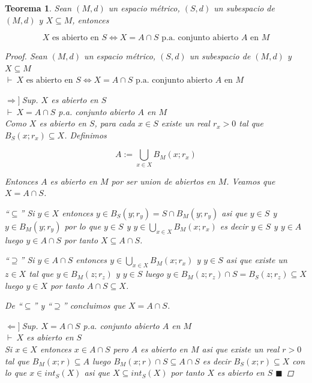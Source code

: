 \documentclass[oneside]{book} %
\theoremstyle{Teorema}
\newtheorem{Teorema}[Definicion]{Teorema}
\theoremstyle{Ejemplos}
\theoremstyle{[Obs]}
\renewcommand{\{}{\left\lbrace} %
\renewcommand{\}}{\right\rbrace} %
\newcommand{\n}{\cap} %
\newcommand{\U}{\bigcup} %
\renewcommand{\sc}{\subseteq} %
\renewcommand{\qed}{$\blacksquare$} %
\newcommand{\pd}{$\vdash\ $} %
\newcommand{\necesidad}{$\Rightarrow]\ $} %
\newcommand{\suficiencia}{$\Leftarrow]\ $} %
\begin{document}
			\begin{Teorema}\setlength{\parindent}{0em}
				
				Sean $(M, d)$ un espacio métrico, $(S, d)$ un subespacio de $(M, d)$ y $X \sc M$, entonces

				\[ X \text{ es abierto en } S \Leftrightarrow X = A \n S \text{ p.a. conjunto abierto } A \text{ en } M \] 

				\begin{proof}
					
					Sean $(M, d)$ un espacio métrico, $(S, d)$ un subespacio de $(M, d)$ y $X \sc M$ \\ 
					\pd $X \text{ es abierto en } S \Leftrightarrow X = A \n S \text{ p.a. conjunto abierto } A \text{ en } M$ 

					\necesidad Sup. $X$ es abierto en $S$ \\ 
					\pd $X = A \n S$ p.a. conjunto abierto $A$ en $M$ \\ 
					Como $X$ es abierto en $S$, para cada $x \in S$ existe un real $r_x > 0$ tal que $B_S(x;r_x) \sc X$. Definimos 

					\[ A := \U_{x \in X} B_M(x;r_x) \]

					Entonces $A$ es abierto en $M$ por ser union de abiertos en $M$. Veamos que $X = A \n S$. 

					``$\sc$'' Si $y \in X$ entonces $y \in B_S(y;r_y) = S \n B_M(y;r_y)$ asi que $y \in S$ y $y \in B_M(y;r_y)$ por lo que $y \in S$ y $y \in \U_{x \in X} B_{M}(x;r_x)$ es decir $y \in S$ y $y \in A$ luego $y \in A \n S$ por tanto $X \sc A \n S$.

					``$\supseteq$'' Si $y \in A \n S$ entonces $y \in \U_{x \in X} B_{M}(x;r_x)$ y $y \in S$ asi que existe un $z \in X$ tal que $y \in B_{M}(z;r_z)$ y $y \in S$ luego $y \in B_{M}(z;r_z) \n S = B_{S}(z;r_z) \sc X$ luego $y \in X$ por tanto $A \n S \sc X$.

					De ``$\sc$'' y ``$\supseteq$'' concluimos que $X = A \n S$.

					\suficiencia Sup. $X = A \n S$ p.a. conjunto abierto $A$ en $M$ \\ 
					\pd $X$ es abierto en $S$ \\ 
					Si $x \in X$ entonces $x \in A \n S$ pero $A$ es abierto en $M$ asi que existe un real $r > 0$ tal que $B_M(x;r) \sc A$ luego $B_M(x;r) \n S \sc A \n S$ es decir $B_S(x;r) \sc X$ con lo que $x \in int_S(X)$ asi que $X \sc int_S(X)$ por tanto $X$ es abierto en $S$ \qed 

				\end{proof}

			\end{Teorema}
\end{document}
